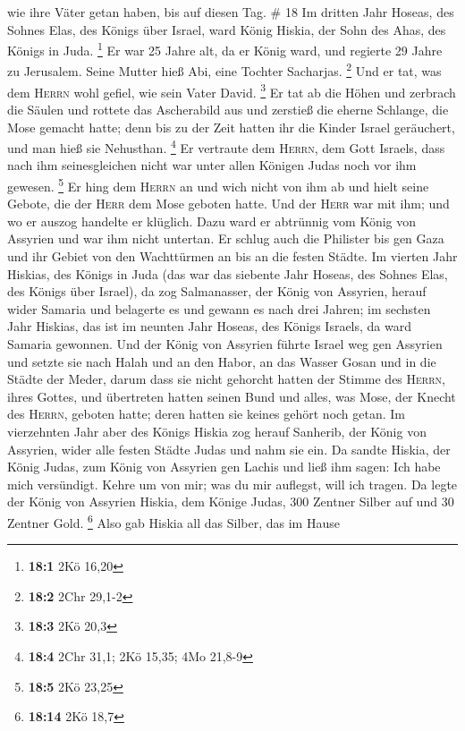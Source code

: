 wie ihre Väter getan haben, bis auf diesen Tag. \# 18  Im
dritten Jahr Hoseas, des Sohnes Elas, des Königs über Israel, ward König
Hiskia, der Sohn des Ahas, des Königs in Juda. \footnote{\textbf{18:1}
  2Kö 16,20}  Er war 25 Jahre alt, da er König ward, und
regierte 29 Jahre zu Jerusalem. Seine Mutter hieß Abi, eine Tochter
Sacharjas. \footnote{\textbf{18:2} 2Chr 29,1-2}  Und er
tat, was dem \textsc{Herrn} wohl gefiel, wie sein Vater David.
\footnote{\textbf{18:3} 2Kö 20,3}  Er tat ab die Höhen und
zerbrach die Säulen und rottete das Ascherabild aus und zerstieß die
eherne Schlange, die Mose gemacht hatte; denn bis zu der Zeit hatten ihr
die Kinder Israel geräuchert, und man hieß sie Nehusthan. \footnote{\textbf{18:4}
  2Chr 31,1; 2Kö 15,35; 4Mo 21,8-9}  Er vertraute dem
\textsc{Herrn}, dem Gott Israels, dass nach ihm seinesgleichen nicht war
unter allen Königen Judas noch vor ihm gewesen. \footnote{\textbf{18:5}
  2Kö 23,25}  Er hing dem \textsc{Herrn} an und wich nicht
von ihm ab und hielt seine Gebote, die der \textsc{Herr} dem Mose
geboten hatte.  Und der \textsc{Herr} war mit ihm; und wo
er auszog handelte er klüglich. Dazu ward er abtrünnig vom König von
Assyrien und war ihm nicht untertan.  Er schlug auch die
Philister bis gen Gaza und ihr Gebiet von den Wachttürmen an bis an die
festen Städte.  Im vierten Jahr Hiskias, des Königs in
Juda (das war das siebente Jahr Hoseas, des Sohnes Elas, des Königs über
Israel), da zog Salmanasser, der König von Assyrien, herauf wider
Samaria und belagerte es  und gewann es nach drei Jahren;
im sechsten Jahr Hiskias, das ist im neunten Jahr Hoseas, des Königs
Israels, da ward Samaria gewonnen.  Und der König von
Assyrien führte Israel weg gen Assyrien und setzte sie nach Halah und an
den Habor, an das Wasser Gosan und in die Städte der Meder,
 darum dass sie nicht gehorcht hatten der Stimme des
\textsc{Herrn}, ihres Gottes, und übertreten hatten seinen Bund und
alles, was Mose, der Knecht des \textsc{Herrn}, geboten hatte; deren
hatten sie keines gehört noch getan.  Im vierzehnten Jahr
aber des Königs Hiskia zog herauf Sanherib, der König von Assyrien,
wider alle festen Städte Judas und nahm sie ein.  Da
sandte Hiskia, der König Judas, zum König von Assyrien gen Lachis und
ließ ihm sagen: Ich habe mich versündigt. Kehre um von mir; was du mir
auflegst, will ich tragen. Da legte der König von Assyrien Hiskia, dem
Könige Judas, 300 Zentner Silber auf und 30 Zentner Gold. \footnote{\textbf{18:14}
  2Kö 18,7}  Also gab Hiskia all das Silber, das im Hause

